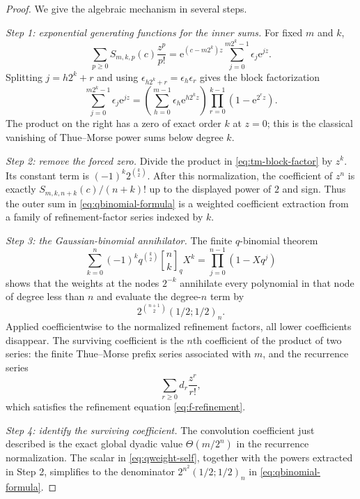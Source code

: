 \documentclass[11pt]{article}
\numberwithin{equation}{section}
\theoremstyle{definition}
\theoremstyle{remark}
\newcommand{\e}{\mathrm{e}}
\newcommand{\Th}{\Theta}
\begin{document}
\begin{proof}
We give the algebraic mechanism in several steps.

\emph{Step 1: exponential generating functions for the inner sums.}
For fixed $m$ and $k$,
\begin{equation}\label{eq:S-egf}
 \sum_{p\ge0}S_{m,k,p}(c)\frac{z^p}{p!}
 =\e^{(c-m2^k)z}
  \sum_{j=0}^{m2^k-1}\epsilon_j\e^{jz}.
\end{equation}
Splitting $j=h2^k+r$ and using
$\epsilon_{h2^k+r}=\epsilon_h\epsilon_r$ gives the block factorization
\begin{equation}\label{eq:tm-block-factor}
 \sum_{j=0}^{m2^k-1}\epsilon_j\e^{jz}
 =\left(\sum_{h=0}^{m-1}\epsilon_h\e^{h2^kz}\right)
  \prod_{r=0}^{k-1}(1-\e^{2^rz}).
\end{equation}
The product on the right has a zero of exact order $k$ at $z=0$; this is the
classical vanishing of Thue--Morse power sums below degree $k$.

\emph{Step 2: remove the forced zero.}
Divide the product in \eqref{eq:tm-block-factor} by $z^k$.  Its constant term
is $(-1)^k2^{\binom k2}$.  After this normalization, the coefficient of
$z^n$ is exactly
$S_{m,k,n+k}(c)/(n+k)!$ up to the displayed power of $2$ and sign.  Thus the
outer sum in \eqref{eq:qbinomial-formula} is a weighted coefficient extraction
from a family of refinement-factor series indexed by $k$.

\emph{Step 3: the Gaussian-binomial annihilator.}
The finite $q$-binomial theorem
\begin{equation}\label{eq:finite-q-binomial}
 \sum_{k=0}^{n}(-1)^kq^{\binom k2}\genfrac{[}{]}{0pt}{}{n}{k}_qX^k
 =\prod_{j=0}^{n-1}(1-Xq^j)
\end{equation}
shows that the weights at the nodes $2^{-k}$ annihilate every polynomial in
that node of degree less than $n$ and evaluate the degree-$n$ term by
\begin{equation}\label{eq:qweight-self}
 2^{\binom{n+1}{2}}(1/2;1/2)_n.
\end{equation}
Applied coefficientwise to the normalized refinement factors, all lower
coefficients disappear.  The surviving coefficient is the $n$th coefficient
of the product of two series: the finite Thue--Morse prefix series associated
with $m$, and the recurrence series
\[
 \sum_{r\ge0}d_r\frac{z^r}{r!},
\]
which satisfies the refinement equation \eqref{eq:f-refinement}.

\emph{Step 4: identify the surviving coefficient.}
The convolution coefficient just described is the exact global dyadic value
$\Th(m/2^n)$ in the recurrence normalization.  The scalar in
\eqref{eq:qweight-self}, together with the powers extracted in Step 2,
simplifies to the denominator
$2^{n^2}(1/2;1/2)_n$ in
\eqref{eq:qbinomial-formula}.


\end{proof}
\end{document}

